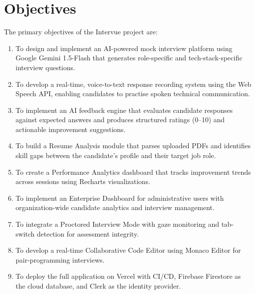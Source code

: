\documentclass{fisatprojectfinal}
\begin{document}
\section{Objectives}
The primary objectives of the Intervue project are:
\begin{enumerate}
  \item To design and implement an AI-powered mock interview platform using Google Gemini
        1.5-Flash that generates role-specific and tech-stack-specific interview questions.
  \item To develop a real-time, voice-to-text response recording system using the Web Speech
        API, enabling candidates to practise spoken technical communication.
  \item To implement an AI feedback engine that evaluates candidate responses against expected
        answers and produces structured ratings (0--10) and actionable improvement suggestions.
  \item To build a Resume Analysis module that parses uploaded PDFs and identifies skill gaps
        between the candidate's profile and their target job role.
  \item To create a Performance Analytics dashboard that tracks improvement trends across
        sessions using Recharts visualizations.
  \item To implement an Enterprise Dashboard for administrative users with organization-wide
        candidate analytics and interview management.
  \item To integrate a Proctored Interview Mode with gaze monitoring and tab-switch detection
        for assessment integrity.
  \item To develop a real-time Collaborative Code Editor using Monaco Editor for
        pair-programming interviews.
  \item To deploy the full application on Vercel with CI/CD, Firebase Firestore as the cloud
        database, and Clerk as the identity provider.
\end{enumerate}
\end{document}
